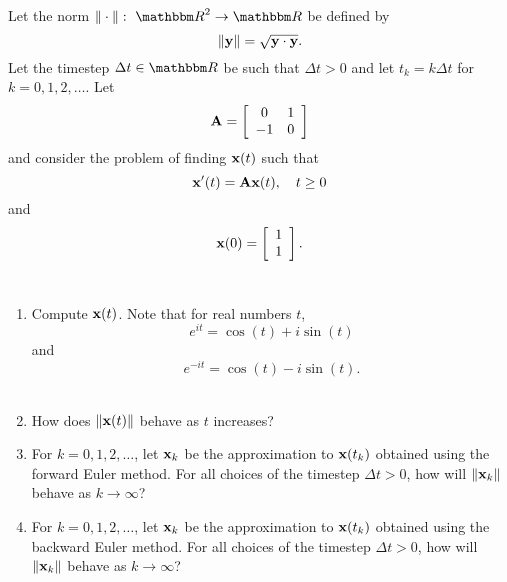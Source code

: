 
Let the norm $\norm{\cdot}:\mbox{ }\R^2\rightarrow\R$ be defined by
\[
\|{\bf y}\| = \sqrt{{\bf y}\cdot {\bf y}}.
\]
Let the timestep $\Delta t\in\R$ be such that $\Delta t>0$ and let $t_k=k\Delta t$ for $k=0,1,2,\ldots$. Let
\[
{\bf A} = \left[\begin{array}{cc}0 & 1 \cr -1 & 0\end{array}\right]
\]
and consider the problem of finding ${\bf x}(t)$ such that
\[
{\bf x}'(t) = {\bf A}{\bf x}(t),\quad t\ge 0
\]
and
\[
{\bf x}(0) = \left[\begin{array}{c}1 \\ 1\end{array}\right].
\]
\\
\begin{enumerate}
\item Compute ${\bf x}(t)$. Note that for real numbers $t$, 
\[
e^{i t} = \cos(t) + i\sin(t)
\]
and
\[
e^{-i t} = \cos(t) - i\sin(t).
\]
\\
\item How does $\|{\bf x}(t)\|$ behave as $t$ increases?
\\
\item For $k=0,1,2,\ldots$, let ${\bf x}_k$ be the approximation to ${\bf x}(t_k)$ obtained using the forward Euler method. For all choices of the timestep $\Delta t>0$, how will $\|{\bf x}_k\|$ behave as $k\rightarrow\infty$?
\\
\item For $k=0,1,2,\ldots$, let ${\bf x}_k$ be the approximation to ${\bf x}(t_k)$ obtained using the backward Euler method. For all choices of the timestep $\Delta t>0$, how will $\|{\bf x}_k\|$ behave as $k\rightarrow\infty$?
\end{enumerate}




